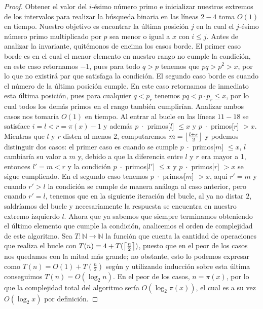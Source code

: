 \documentclass[10pt]{article}
\DeclarePairedDelimiter\ceil{\lceil}{\rceil}
\DeclarePairedDelimiter\floor{\lfloor}{\rfloor}
\theoremstyle{definition}
\theoremstyle{remark}
\newcommand{\BN}{\mathbb N}
\begin{document}
\begin{proof}
Obtener el valor del $i$-\'esimo n\'umero primo e inicializar
nuestros extremos de los intervalos para realizar la b\'usqueda binaria en las l\'ineas
$2 - 4$ toma $O(1)$ en tiempo.
Nuestro objetivo es encontrar la \'ultima posici\'on $j$ en la cual
el $j$-\'esimo n\'umero primo multiplicado por $p$ sea menor o igual a $x$ con $i \leq j$. Antes de analizar la invariante, quit\'emonos de encima los casos borde.
El primer caso borde es en el cual el menor elemento en nuestro rango no cumple la condici\'on,
en este caso retornamos $-1$, pues para todo $q > p$ tenemos que $pq > p^2 > x$,
por lo que no existir\'a par que satisfaga la condici\'on.
El segundo caso borde es cuando el n\'umero de la \'ultima posici\'on cumple.
En este caso retornamos de inmediato esta \'ultima posici\'on,
pues para cualquier $q < p_r$ tenemos $pq < p \cdot p_r \leq x$,
por lo cual todos los dem\'as primos en el rango tambi\'en cumplir\'ian.
Analizar ambos casos nos tomar\'ia $O(1)$ en tiempo.
Al entrar al bucle en las l\'ineas $11 - 18$ se satisface $i = l < r = \pi(x) - 1$ y adem\'as
$p\;\cdot$ primos[$l$] $\leq x$ y $p\;\cdot$ primos[$r$] $> x$.
Mientras que $l$ y $r$ disten al menos 2, computaremos $m = \floor*{\frac{l + r}{2}}$
y podemos distinguir dos casos:
el primer caso es cuando se cumple $p\;\cdot$ primos[$m$] $\leq x$, $l$ cambiar\'ia
su valor a $m$ y, debido a que la diferencia entre $l$ y $r$ era mayor a 1, entonces
$l' = m < r$ y la condici\'on $p\;\cdot$ primos[$l'$] $\leq x$ y $p\;\cdot$ primos[$r$] $> x$ se sigue cumpliendo.
En el segundo caso tenemos $p\;\cdot$ primos[$m$] $> x$, aqu\'i $r' = m$ y cuando $r' > l$ la condici\'on se cumple de manera an\'aloga al caso anterior,
pero cuando $r' = l$, tenemos que en la siguiente iteraci\'on del bucle, al ya no distar $2$, saldr\'iamos del bucle
y necesariamente la respuesta se encuentra en nuestro extremo izquierdo $l$.
Ahora que ya sabemos que siempre terminamos obteniendo el \'ultimo elemento que cumple la condici\'on, analicemos el
orden de complejidad de este algoritmo. Sea $T: \BN \to \BN$ la funci\'on que cuenta la cantidad de operaciones
que realiza el bucle con $T(n) = 4 + T(\ceil*{\frac{n}{2}})$,
puesto que en el peor de los casos nos quedamos con la mitad m\'as grande;
no obstante, esto lo podemos expresar como $T(n) = O(1) + T(\frac{n}{2})$ seg\'un \cite{CLRS}
y utilizando inducci\'on sobre esta \'ultima conseguimos $T(n) = O(\log_2 n)$.
En el peor de los casos, $n = \pi(x)$, por lo que la complejidad total del algoritmo ser\'ia
$O(\log_2 \pi(x))$, el cual es a su vez $O(\log_2 x)$ por definici\'on.
\end{proof}
\end{document}
